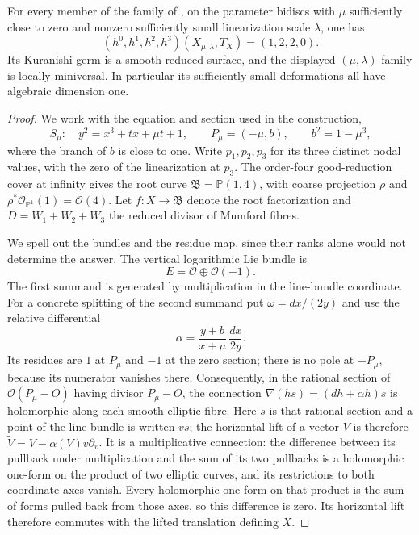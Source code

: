 
\begin{proposition}\label{cdp:st:E13}
For every member of the family of
\cite[Proposition labelled \texttt{family}]{Viaclovsky2026Two}, on the parameter
bidiscs with $\mu$ sufficiently close to zero and nonzero sufficiently
small linearization scale $\lambda$, one has
\[
 (h^0,h^1,h^2,h^3)(X_{\mu,\lambda},T_X)=(1,2,2,0).
\]
Its Kuranishi germ is a smooth reduced surface, and the displayed
$(\mu,\lambda)$-family is locally miniversal. In particular its
sufficiently small deformations all have algebraic dimension one.
\end{proposition}
\begin{proof}
We work with the equation and section used in the construction,
\[
 S_\mu:\quad y^2=x^3+tx+\mu t+1,\qquad
 P_\mu=(-\mu,b),\qquad b^2=1-\mu^3,
\]
where the branch of $b$ is close to one. Write $p_1,p_2,p_3$ for its
three distinct nodal values, with the zero of the linearization at
$p_3$. The order-four good-reduction cover at infinity gives the
root curve $\mathfrak B=\mathbb P(1,4)$, with coarse projection
$\rho$ and $\rho^*\mathcal O_{\mathbb P^1}(1)=\mathcal O(4)$.
Let $\bar f:X\to\mathfrak B$ denote the root factorization and
$D=W_1+W_2+W_3$ the reduced divisor of Mumford fibres.

We spell out the bundles and the residue map, since their ranks alone
would not determine the answer. The vertical logarithmic Lie bundle
is
\[
 E=\mathcal O\oplus\mathcal O(-1).
\]
The first summand is generated by multiplication in the line-bundle
coordinate. For a concrete splitting of the second summand put
$\omega=dx/(2y)$ and use the relative differential
\begin{equation}\label{cdp:eq:E13-connection}
 \alpha=\frac{y+b}{x+\mu}\,\frac{dx}{2y}.
\end{equation}
Its residues are $1$ at $P_\mu$ and $-1$ at the zero section; there
is no pole at $-P_\mu$, because its numerator vanishes there.
Consequently, in the rational section of
$\mathcal O(P_\mu-O)$ having divisor $P_\mu-O$, the connection
$\nabla(hs)=(dh+\alpha h)s$ is holomorphic along each smooth
elliptic fibre. Here $s$ is that rational section and a point of
the line bundle is written $v s$; the horizontal lift of a vector
$V$ is therefore $\widetilde V=V-\alpha(V)v\partial_v$.
It is a multiplicative connection: the difference between its
pullback under multiplication and the sum of its two pullbacks is a
holomorphic one-form on the product of two elliptic curves, and its
restrictions to both coordinate axes vanish. Every holomorphic
one-form on that product is the sum of forms pulled back from those
axes, so this difference is zero. Its horizontal lift therefore
commutes with the lifted translation defining $X$.


\end{proof}
